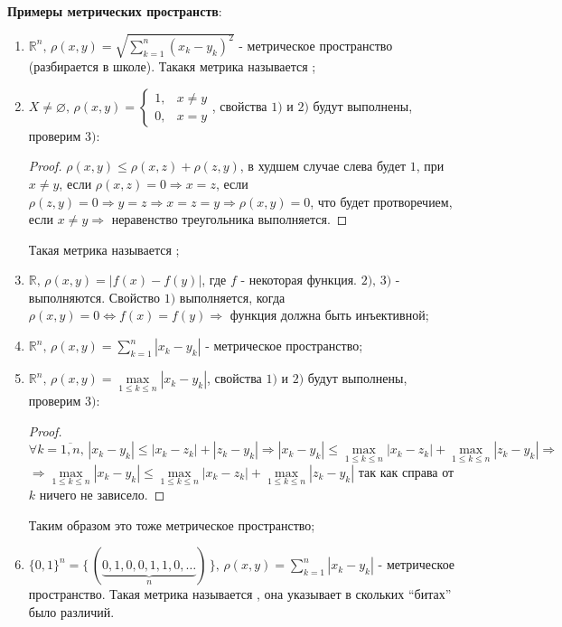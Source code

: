 \documentclass[12pt]{article}
\newcommand{\MR}{\mathbb{R}}
\newcommand{\VN}{\varnothing}
\theoremstyle{definition}
\begin{document}
\textbf{Примеры метрических пространств}:
\begin{enumerate}[label={(\arabic*)}]
	\item $\MR^n, \, \rho(x,y) = \sqrt{ \displaystyle \sum\limits_{k=1}^{n}(x_k - y_k)^2}$  - метрическое пространство (разбирается в школе). Такакя метрика называется ;
	\item $X \neq \VN, \, \rho(x,y) = \begin{cases} 1, & x \neq y \\ 0, & x = y \end{cases} $, свойства $1)$ и $2)$ будут выполнены, проверим $3)$:
	\begin{proof}
		$\rho(x,y) \leq \rho(x,z) + \rho(z,y)$, в худшем случае слева будет $1$, при $x \neq y$, если $\rho(x,z) = 0 \Rightarrow x = z$, если $\rho(z,y) = 0 \Rightarrow y = z \Rightarrow x = z = y \Rightarrow \rho(x,y) = 0$, что будет протворечием, если $x \neq y \Rightarrow$ неравенство треугольника выполняется.
	\end{proof}
	Такая метрика называется ;
	
	\item $\MR, \, \rho(x,y) = |f(x) - f(y)|$, где $f$ - некоторая функция. $2), \, 3)$ - выполняются. Свойство $1)$ выполняется, когда
	$\rho(x,y) = 0 \Leftrightarrow f(x) = f(y) \Rightarrow$ функция должна быть инъективной;
	
	\item $\MR^n, \, \rho(x,y) = \displaystyle \sum\limits_{k=1}^{n}|x_k - y_k|$ - метрическое пространство;
	
	\item $\MR^n, \, \rho(x,y) = \max\limits_{1 \leq k \leq n}|x_k - y_k|$, свойства $1)$ и $2)$ будут выполнены, проверим $3)$:
	\begin{proof}
		$\forall k =\overline{1,n}, \, |x_k - y_k| \leq |x_k - z_k| + |z_k - y_k| \Rightarrow |x_k - y_k| \leq \max\limits_{1 \leq k \leq n}|x_k - z_k| + \max\limits_{1 \leq k \leq n}|z_k - y_k| \Rightarrow$ \\
		$\Rightarrow  \max\limits_{1 \leq k \leq n}|x_k - y_k| \leq \max\limits_{1 \leq k \leq n}|x_k - z_k| + \max\limits_{1 \leq k \leq n}|z_k - y_k|$ так как справа от $k$ ничего не зависело.
	\end{proof}
	Таким образом это тоже метрическое пространство;
	
	\item $\{0,1\}^n = \{\,(\underbrace{0,1,0,0,1,1,0, \dotsc}_{n}) \,\}, \, \rho(x,y) = \displaystyle \sum\limits_{k=1}^{n}|x_k - y_k|$ - метрическое пространство. Такая метрика называется , она указывает в скольких ``битах'' было различий.
	

\end{enumerate}
\end{document}
